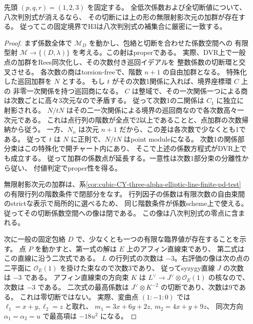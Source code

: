 \begin{theorem}\label{thm:cubic-CY-three-alpha-elliptic-diagonal-classification-123}
先頭 $(p,q,r)=(1,2,3)$ を固定する。
全低次係数および全切断値について、八次判別式が消えるなら、
その切断には上の形の無限射影次元の加群が存在する。
従ってこの固定境界でH3は八次判別式の補集合に厳密に一致する。
\end{theorem}
\begin{proof}
まず係数全体で $\mathcal M_D$ を動かし、包絡と切断を合わせた係数空間への
有限型射 $\mathcal M\to\{(D,\lambda)\}$ を考える。この射はproperである。
実際、DVR上で一般点の加群をRees同次化し、その次数付き巡回イデアルを
整数係数の切断環と交叉させる。
各次数の商はtorsion-freeで、階数 $n+1$ の自由加群となる。
特殊化した巡回加群を $N$ とする。
もし $t$ がその次数1関係に入れば、境界座標環 $C$ 上の
非零一次関係を持つ巡回商になる。
$C$ は整域で、その一次関係一つによる商は次数ごとに高々3次元なので矛盾する。
従って次数1の二関係は $C_1$ に独立に射影される。
$N/tN$ はその二一次関係による境界の巡回商なので各次数高々一次元である。
これは点行列の階数が全点で2以上であることと、点加群の次数帰納から従う。
一方、$N_n$ は次元 $n+1$ だから、この差は各次数で少なくとも1である。
従って $t$ は $N$ に正則で、$N/tN$ はpoint moduleになる。
次数1の関係部分束はこの特殊化で開チャート内にあり、
そこで上述の係数方程式がDVR上でも成立する。
従って加群の係数点が延長する。一意性は次数1部分束の分離性から従い、
付値判定でproper性を得る。

無限射影次元の加群は、系\ref{cor:cubic-CY-three-alpha-elliptic-line-finite-pd-test}
の有限行列の階数条件で閉部分をなす。
行列因子の係数は有限次数の自由束間のstrictな表示で局所的に選べるため、
同じ階数条件が係数scheme上で使える。
従ってその切断係数空間への像は閉である。
この像は八次判別式の零点に含まれる。

次に一般の固定包絡 $D$ で、少なくとも一つの有限な臨界値が存在することを示す。
点 $P$ を動かすと、第一式の解は $E$ 上のアフィン直線束であり、
第二式はこの直線に沿う二次式である。
$L$ の行列式の次数は $-3$。右評価の像は次の点の二平面に
$\mathcal O_E(1)$ を掛けた束なので次数3であり、
従ってsyzygy直線 $J$ の次数は $-3$ である。
アフィン直線束の方向束 $K$ は
$L^\vee\to J^\vee\otimes\mathcal O_E(1)$ の核なので、次数は $-3$ である。
二次式の最高係数は $J^\vee\otimes K^{-2}$ の切断であり、次数は9である。
これは零切断ではない。
実際、変曲点 $(1:-1:0)$ では
$\ell_1=x+y,\ell_2=z$ と取れ、
$m_1=3x+6y+2z,\ m_2=4x+y+9z$、
同次方向 $\alpha_1=\alpha_2=u$ で最高項は $-18u^2$ になる。


\end{proof}

